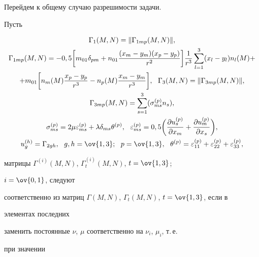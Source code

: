  


Перейдем к общему случаю разрешимости задачи.  


Пусть 


\begin{gather*} 


\Gamma_1(M,N)=\|\Gamma_{1mp}(M,N)\|,\\  


%


\Gamma_{1mp}(M,N)=-0,5\bigg[m_{01}\delta_{pm}+n_{01} 


\frac{(x_m-y_m)(x_p-y_p)}{r^2}\bigg]\frac{1}{r^3} 


\sum^3_{l=1}(x_l-y_l)n_l(M)+\\ 


% 


+m_{01}\bigg[n_m(M)\frac{x_p-y_p}{r^3}-n_p(M) 


\frac{x_m-y_m}{r^3}\bigg],\ \ \Gamma_3(M,N)=\|\Gamma_{3mp}(M,N)\|,\\  


%


\Gamma_{3mp}(M,N)=\sum^3_{s=1}(\sigma^{(p)}_{ms}n_s),\\ 


% 


\sigma^{(p)}_{ms}=2\mu\varepsilon^{(p)}_{ms}+\lambda\delta_{ms} 


\theta^{(p)},\ \ \varepsilon^{(p)}_{ms}=0,5\bigg( 


\frac{\partial u^{(p)}_s}{\partial x_m}+ 


\frac{\partial u^{(p)}_m}{\partial x_s}\bigg),\\  


%


u^{(h)}_g=\Gamma_{2gh},\ \ g,h=\ov{1,3};\ \ p=\ov{1,3},\ \  


\theta^{(p)}=\varepsilon^{(p)}_{11}+ 


\varepsilon^{(p)}_{22}+\varepsilon^{(p)}_{33}, 


\end{gather*} 


матрицы $\Gamma^{(i)}(M,N)$, $\Gamma^{(i)}_t(M,N)$, $t=\ov{1,3}$; 


$i=\ov{0,1}$, следуют  


соответственно из матриц $\Gamma(M,N)$, $\Gamma_t(M,N)$, $t=\ov{1,3}$, если в 


элементах последних  


заменить постоянные $\nu$, $\mu$ соответственно на $\nu_i$, $\mu_i$, т.\,е. 


при значении  



